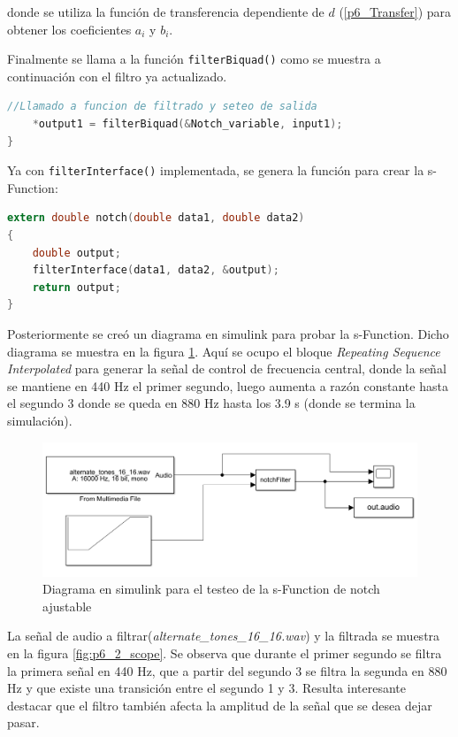 \begin{enumerate}
\begin{lstlisting}[language = C]
\end{lstlisting}
donde se utiliza la función de transferencia dependiente de $d$ (\ref{p6_Transfer}) para obtener los coeficientes $a_i$ y $b_i$.

Finalmente se llama a la función \texttt{filterBiquad()} como se muestra a continuación con el filtro ya actualizado.
\begin{lstlisting}[language = C]
//Llamado a funcion de filtrado y seteo de salida
    *output1 = filterBiquad(&Notch_variable, input1);
}
\end{lstlisting}
Ya con \texttt{filterInterface()} implementada, se genera la función para crear la s-Function:

\begin{lstlisting}[language = C]
extern double notch(double data1, double data2)
{
    double output;
    filterInterface(data1, data2, &output);
    return output;
}
\end{lstlisting}

Posteriormente se creó un diagrama en simulink para probar la s-Function. Dicho diagrama se muestra en la figura \ref{fig:p6_2_simulink}. Aquí se ocupo el bloque \textit{Repeating Sequence Interpolated} para generar la señal de control de frecuencia central, donde la señal se mantiene en 440 Hz el primer segundo, luego aumenta a razón constante hasta el segundo 3 donde se queda en 880 Hz hasta los 3.9 s (donde se termina la simulación). 
\begin{figure}[H]
    \centering
    \includegraphics[width = .8\linewidth]{Figuras/p6_2_simulink.png}
    \caption{Diagrama en simulink para el testeo de la s-Function de notch ajustable}
    \label{fig:p6_2_simulink}
\end{figure}
 
 La señal de  audio a filtrar(\textit{alternate\_tones\_16\_16.wav}) y la filtrada se muestra en la figura \ref{fig:p6_2_scope}. Se observa que durante el primer segundo se filtra la primera señal en 440 Hz, que a partir del segundo 3 se filtra la segunda en 880 Hz y que existe una transición entre el segundo 1 y 3. Resulta interesante destacar que el filtro también afecta la amplitud de la señal que se desea dejar pasar. 
 

\end{enumerate}
